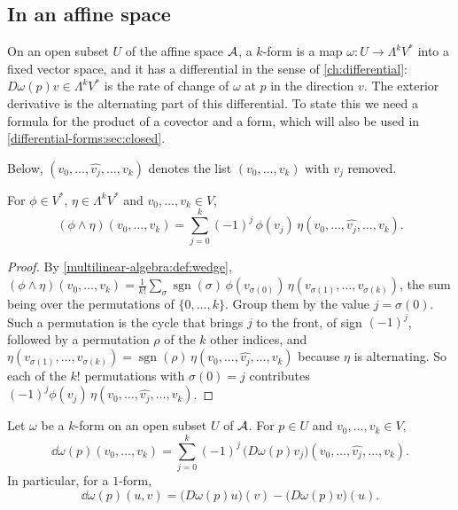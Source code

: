 \begin{notechapter}
\section{In an affine space}\label{differential-forms:sec:affine}

On an open subset $U$ of the affine space $\mathcal{A}$, a $k$-form is a map
$\omega:U\to\Lambda^kV^*$ into a fixed vector space, and it has a
differential in the sense of \cref{ch:differential}:
$D\omega(p)v\in\Lambda^kV^*$ is the rate of change of $\omega$ at $p$ in
the direction $v$. The exterior derivative is the alternating part of
this differential. To state this we need a formula for the product of a
covector and a form, which will also be used in
\cref{differential-forms:sec:closed}.

Below, $(v_0,\dots,\widehat{v_j},\dots,v_k)$ denotes the list
$(v_0,\dots,v_k)$ with $v_j$ removed.

\begin{lemma}
\label{differential-forms:lem:covector}
For $\phi\in V^*$, $\eta\in\Lambda^kV^*$ and $v_0,\dots,v_k\in V$,
\[
  (\phi\wedge\eta)(v_0,\dots,v_k)
  = \sum_{j=0}^k(-1)^j\,\phi(v_j)\,
    \eta(v_0,\dots,\widehat{v_j},\dots,v_k) .
\]
\end{lemma}

\begin{proof}
By \cref{multilinear-algebra:def:wedge},
$(\phi\wedge\eta)(v_0,\dots,v_k) = \frac1{k!}\sum_\sigma
\operatorname{sgn}(\sigma)\,\phi(v_{\sigma(0)})\,
\eta(v_{\sigma(1)},\dots,v_{\sigma(k)})$, the sum being over the
permutations of $\{0,\dots,k\}$. Group them by the value
$j = \sigma(0)$. Such a permutation is the cycle that brings $j$ to the
front, of sign $(-1)^j$, followed by a permutation $\rho$ of the $k$
other indices, and
$\eta(v_{\sigma(1)},\dots,v_{\sigma(k)})
= \operatorname{sgn}(\rho)\,\eta(v_0,\dots,\widehat{v_j},\dots,v_k)$
because $\eta$ is alternating. So each of the $k!$ permutations with
$\sigma(0) = j$ contributes
$(-1)^j\phi(v_j)\,\eta(v_0,\dots,\widehat{v_j},\dots,v_k)$.
\end{proof}

\begin{theorem}
\label{differential-forms:thm:affine}
Let $\omega$ be a $k$-form on an open subset $U$ of $\mathcal{A}$. For
$p\in U$ and $v_0,\dots,v_k\in V$,
\[
  \dd\omega(p)(v_0,\dots,v_k)
  = \sum_{j=0}^k(-1)^j\,\bigl(D\omega(p)v_j\bigr)
    (v_0,\dots,\widehat{v_j},\dots,v_k) .
\]
In particular, for a $1$-form,
\[
  \dd\omega(p)(u, v)
  = \bigl(D\omega(p)u\bigr)(v) - \bigl(D\omega(p)v\bigr)(u) .
\]
\end{theorem}


\end{notechapter}
